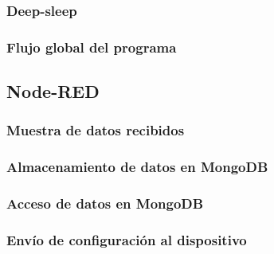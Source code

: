 \subsubsection{Deep-sleep}

\subsubsection{Flujo global del programa}

\subsection{Node-RED}

\subsubsection{Muestra de datos recibidos}

\subsubsection{Almacenamiento de datos en MongoDB}

\subsubsection{Acceso de datos en MongoDB}

\subsubsection{Envío de configuración al dispositivo}